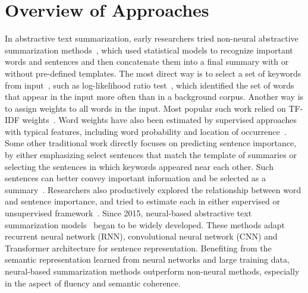 \section{Overview of Approaches}
\label{sec:approach}

In abstractive text summarization, early researchers tried non-neural abstractive summarization methods~\cite{banko-etal-2000-headline}, which used statistical models to recognize important words and sentences and then concatenate them into a final summary with or without pre-defined templates. The most direct way is to select a set of keywords from input~\cite{nenkova2005impact}, such as log-likelihood ratio test~\cite{lin2000automated}, which identified the set of words that appear in the input more often than in a background corpus. Another way is to assign weights to all words in the input. Most popular such work relied on TF-IDF weights~\cite{berg2011jointly}. Word weights have also been estimated by supervised approaches with typical features, including word probability and location of occurrence~\cite{sipos2012large}. Some other traditional work directly focuses on predicting sentence importance, by either emphasizing select sentences that match the template of summaries or selecting the sentences in which keywords appeared near each other. Such sentences can better convey important information and be selected as a summary~\cite{celikyilmaz2010hybrid,litvak2010new}. Researchers also productively explored the relationship between word and sentence importance, and tried to estimate each in either supervised or unsupervised framework~\cite{liu2010supervised}. Since 2015, neural-based abstractive text summarization models~\cite{rush2015neural, nallapati2016abstractive, see2017get, liu2021keyword} began to be widely developed. These methods adapt recurrent neural network (RNN), convolutional neural network
(CNN) and Transformer architecture for sentence representation. Benefiting from the semantic representation learned from
neural networks and large training data, neural-based summarization methods outperform non-neural methods, especially in the aspect of fluency and semantic coherence.


